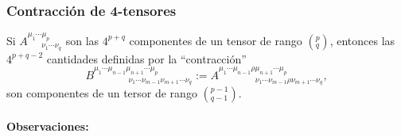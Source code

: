\subsubsection{Contracción de 4-tensores}
 Si $A^{\mu_1 \cdots\mu_p}_{\ \ \ \ \ \ \ \
\nu_1\cdots\nu_q}$ son las $4^{p+q}$ componentes de un tensor de rango $(^p_q)$, entonces las $4^{p+q-2}$ cantidades definidas por la ``contracción''
\begin{equation}
B^{\mu_1 \cdots\mu_{n-1}\mu_{n+1}\cdots\mu_p}_{\ \ \ \ \ \ \ \ \ \ \ \ \ \ \ \ \ \ \ \ \nu_1\cdots\nu_{m-1}\nu_{m+1}\cdots\nu_q}:=A^{\mu_1
\cdots\mu_{n-1}\rho\mu_{n+1}\cdots\mu_p}_{\ \ \ \ \ \ \ \ \ \ \ \ \ \ \ \ \ \ \
\ \ \nu_1\cdots\nu_{m-1}\rho\nu_{m+1}\cdots\nu_q},
\end{equation}
son componentes de un tersor de rango $(^{p-1}_{q-1})$.

\paragraph{Observaciones:}

